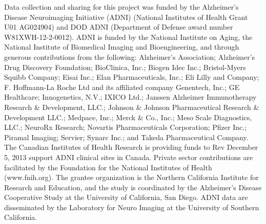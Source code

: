 \documentclass[authoryear,preprint,revi	ew,12pt]{elsarticle}
\newcommand{\Alz} {{Alzheimer\textquoteright s} }
\begin{document}
Data collection and sharing for this project was funded by the Alzheimer\textquoteright s Disease Neuroimaging Initiative (ADNI) (National Institutes of Health Grant U01 AG024904) and DOD ADNI (Department of Defense award number W81XWH-12-2-0012). ADNI is funded by the National Institute on Aging, the National Institute of Biomedical Imaging and Bioengineering, and through generous contributions from the following: \Alz Association; Alzheimer\textquoteright s Drug Discovery Foundation; BioClinica, Inc.; Biogen Idec Inc.; Bristol-Myers Squibb Company; Eisai Inc.; Elan Pharmaceuticals, Inc.; Eli Lilly and Company; F. Hoffmann-La Roche Ltd and its affiliated company Genentech, Inc.; GE Healthcare; Innogenetics, N.V.; IXICO Ltd.; Janssen Alzheimer Immunotherapy Research \& Development, LLC.; Johnson \& Johnson Pharmaceutical Research \& Development LLC.; Medpace, Inc.; Merck \& Co., Inc.; Meso Scale Diagnostics, LLC.; NeuroRx Research; Novartis Pharmaceuticals Corporation; Pfizer Inc.; Piramal Imaging; Servier; Synarc Inc.; and Takeda Pharmaceutical Company. The Canadian Institutes of Health Research is providing funds to Rev December 5, 2013
support ADNI clinical sites in Canada. Private sector contributions are facilitated by the Foundation for the National Institutes of Health (www.fnih.org). The grantee organization is the Northern California Institute for Research and Education, and the study is coordinated by the Alzheimer\textquoteright s Disease Cooperative Study at the University of California, San Diego. ADNI data are disseminated by the Laboratory for Neuro Imaging at the University of Southern California.

\appendix
\end{document}
